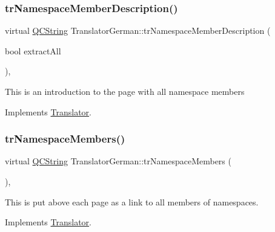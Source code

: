 \mbox{\label{class_translator_german_a3a78703f498873589ac40c6680d93eab}} 
\subsubsection{\texorpdfstring{trNamespaceMemberDescription()}{trNamespaceMemberDescription()}}
{\footnotesize\ttfamily virtual \mbox{\hyperlink{class_q_c_string}{Q\+C\+String}} Translator\+German\+::tr\+Namespace\+Member\+Description (\begin{DoxyParamCaption}\item[{bool}]{extract\+All }\end{DoxyParamCaption})\hspace{0.3cm}{\ttfamily [inline]}, {\ttfamily [virtual]}}

This is an introduction to the page with all namespace members 

Implements \mbox{\hyperlink{class_translator}{Translator}}.

\mbox{\label{class_translator_german_a9200f6301e3f2ffe728e3655e53a3b4d}} 
\subsubsection{\texorpdfstring{trNamespaceMembers()}{trNamespaceMembers()}}
{\footnotesize\ttfamily virtual \mbox{\hyperlink{class_q_c_string}{Q\+C\+String}} Translator\+German\+::tr\+Namespace\+Members (\begin{DoxyParamCaption}{ }\end{DoxyParamCaption})\hspace{0.3cm}{\ttfamily [inline]}, {\ttfamily [virtual]}}

This is put above each page as a link to all members of namespaces. 

Implements \mbox{\hyperlink{class_translator}{Translator}}.

\mbox{\label{class_translator_german_ac528b9a77a504977a6018dc4b4506f81}} 
